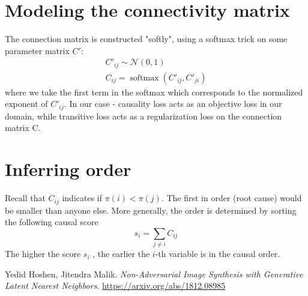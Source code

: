 \documentclass{article}
\DeclareMathOperator{\softmax}{softmax}
\begin{document}
\section{Modeling the connectivity matrix}

The connection matrix is constructed "softly", using a softmax trick on some parameter matrix $C'$:
\begin{gather*}
    C'_{ij} \sim \mathcal{N}(0, 1) \\
    C_{ij} = \softmax (C'_{ij}, C'_{ji})
\end{gather*}
where we take the first term in the softmax which corresponds to the normalized exponent of $C'_{ij}$.
In our case - causality loss acts as an objective loss in our domain, while transitive loss acts as a regularization loss on the connection matrix C.

\section{Inferring order}

Recall that $C_{ij}$ indicates if $\pi(i)<\pi(j)$. The first in order (root cause) would be smaller than anyone else. More generally, the order is determined by sorting the following causal score
$$s_i = \sum_{j\neq i} C_{ij}$$
The higher the score $s_i$ , the earlier the $i$-th variable is in the causal order.



\newpage
\begin{thebibliography}{1}
	
	Yedid Hoshen, Jitendra Malik. \textit{Non-Adversarial Image Synthesis with Generative Latent Nearest Neighbors}.  \href{https://arxiv.org/abs/1812.08985}{https://arxiv.org/abs/1812.08985}
	
\end{thebibliography}
\end{document}
